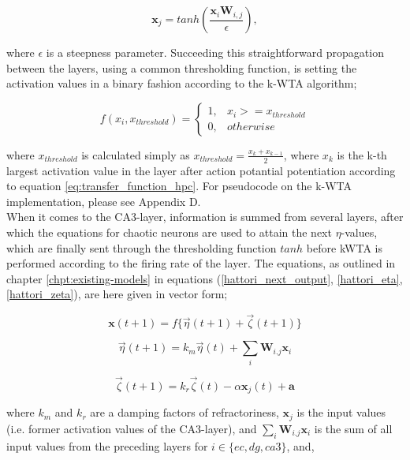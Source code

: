 \begin{equation}\label{eq:transfer_function_hpc}
    \textbf{x}_j = tanh (\frac{\textbf{x}_i \textbf{W}_{i,j}}{\epsilon}),
\end{equation}

where $\epsilon$ is a steepness parameter. Succeeding this straightforward propagation between the layers, using a common thresholding function, is setting the activation values in a binary fashion according to the k-WTA algorithm;

\begin{equation}
    f(x_i, x_{threshold}) = \begin{cases}
    1, & x_i >= x_{threshold} \\
    0, & otherwise
    \end{cases}
\end{equation}

where $x_{threshold}$ is calculated simply as $x_{threshold} = \frac{x_{k} + x_{k-1}}{2}$, where $x_k$ is the k-th largest activation value in the layer after action potantial potentiation according to equation \ref{eq:transfer_function_hpc}. For pseudocode on the k-WTA implementation, please see Appendix D.
\\

When it comes to the CA3-layer, information is summed from several layers, after which the equations for chaotic neurons are used to attain the next $\eta$-values, which are finally sent through the thresholding function $tanh$ before kWTA is performed according to the firing rate of the layer. The equations, as outlined in chapter \ref{chpt:existing-models} in equations (\ref{hattori_next_output}, \ref{hattori_eta}, \ref{hattori_zeta}), are here given in vector form;

\begin{equation}\label{eq:eta_zeta_sum}
    \textbf{x}(t+1) = f\{ \vec{\eta}(t+1) + \vec{\zeta}(t+1) \}
\end{equation}

\begin{equation}
    \vec{\eta}(t+1) = k_m \vec{\eta}(t) + \sum_{i} \textbf{W}_{i.j} \textbf{x}_i
\end{equation}

\begin{equation}
    \vec{\zeta}(t+1) = k_r \vec{\zeta}(t) - \alpha \textbf{x}_j(t) + \textbf{a}
\end{equation}

where $k_m$ and $k_r$ are a damping factors of refractoriness, $\textbf{x}_j$ is the input values (i.e. former activation values of the CA3-layer), and $\sum_{i} \textbf{W}_{i.j} \textbf{x}_i$ is the sum of all input values from the preceding layers for $i\in\{ec, dg, ca3\}$, and,

